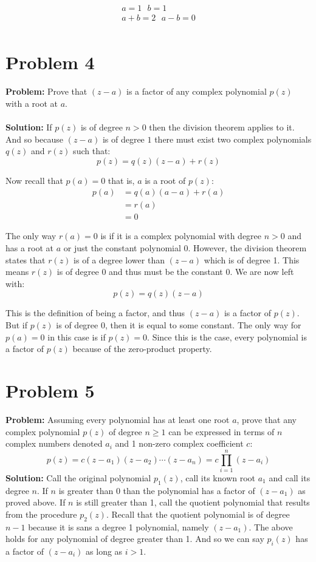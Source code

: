 \documentclass{article}
\begin{document}
\begin{gather*}
  a=1 \ \ \ b=1\tag{odd}\\
  a+b=2\ \ \ a-b=0\tag{even}\\
\end{gather*}

\section*{Problem 4}
\textbf{Problem:} Prove that $(z-a)$ is a factor of any complex polynomial $p(z)$ with a root at $a$.
\\\\
\textbf{Solution:} If $p(z)$ is of degree $n>0$ then the division theorem applies to it. And so because $(z-a)$ is of degree $1$ there must exist two complex polynomials $q(z)$ and $r(z)$ such that:
$$p(z)=q(z)(z-a)+r(z)$$

Now recall that $p(a)=0$ that is, $a$ is a root of $p(z)$:
\begin{align*}
p(a)&=q(a)(a-a)+r(a)\\
&=r(a)\\
&=0
\end{align*}

The only way $r(a)=0$ is if it is a complex polynomial with degree $n>0$ and has a root at $a$ or just the constant polynomial 0. However, the division theorem states that $r(z)$ is of a degree lower than $(z-a)$ which is of degree 1. This means $r(z)$ is of degree 0 and thus must be the constant 0. We are now left with:
$$p(z)=q(z)(z-a)$$

This is the definition of being a factor, and thus $(z-a)$ is a factor of $p(z)$. But if $p(z)$ is of degree 0, then it is equal to some constant. The only way for $p(a)=0$ in this case is if $p(z)=0$. Since this is the case, every polynomial is a factor of $p(z)$ because of the zero-product property.

\section*{Problem 5}
\textbf{Problem:} Assuming every polynomial has at least one root $a$, prove that any complex polynomial $p(z)$ of degree $n\ge1$ can be expressed in terms of $n$ complex numbers denoted $a_i$ and 1 non-zero complex coefficient $c$:
$$p(z)=c(z-a_1)(z-a_2)\cdots(z-a_n)=c\prod_{i=1}^n(z-a_i)$$
\textbf{Solution:} Call the original polynomial $p_1(z)$, call its known root $a_1$ and call its degree $n$. If $n$ is greater than 0 than the polynomial has a factor of $(z-a_1)$ as proved above. If $n$ is still greater than 1, call the quotient polynomial that results from the procedure $p_2(z)$. Recall that the quotient polynomial is of degree $n-1$ because it is sans a degree 1 polynomial, namely $(z-a_1)$. The above holds for any polynomial of degree greater than 1. And so we can say $p_i(z)$ has a factor of $(z-a_i)$ as long as $i>1$.
\end{document}
